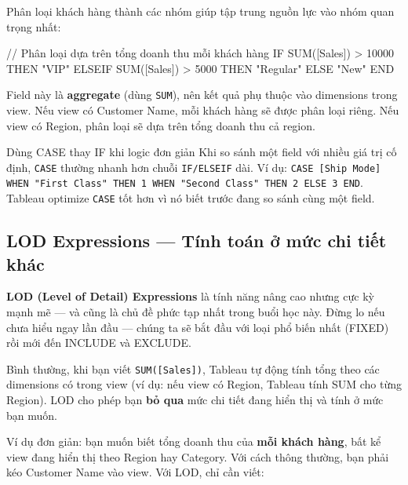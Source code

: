 \documentclass[12pt]{article}
\begin{document}
\noindent Phân loại khách hàng thành các nhóm giúp tập trung nguồn lực vào nhóm quan trọng nhất:

\begin{aivncodebox}[]
\begin{python}
// Phân loại dựa trên tổng doanh thu mỗi khách hàng
IF SUM([Sales]) > 10000 THEN "VIP"
ELSEIF SUM([Sales]) > 5000 THEN "Regular"
ELSE "New"
END
\end{python}
\end{aivncodebox}

\noindent Field này là \textbf{aggregate} (dùng \texttt{SUM}), nên kết quả phụ thuộc vào dimensions trong view. Nếu view có Customer Name, mỗi khách hàng sẽ được phân loại riêng. Nếu view có Region, phân loại sẽ dựa trên tổng doanh thu cả region.

\begin{guidelinebox}{Dùng CASE thay IF khi logic đơn giản}
Khi so sánh một field với nhiều giá trị cố định, \texttt{CASE} thường nhanh hơn chuỗi \texttt{IF/ELSEIF} dài. Ví dụ: \texttt{CASE [Ship Mode] WHEN "First Class" THEN 1 WHEN "Second Class" THEN 2 ELSE 3 END}. Tableau optimize \texttt{CASE} tốt hơn vì nó biết trước đang so sánh cùng một field.
\end{guidelinebox}


\subsection{LOD Expressions --- Tính toán ở mức chi tiết khác}

\noindent \textbf{LOD (Level of Detail) Expressions} là tính năng nâng cao nhưng cực kỳ mạnh mẽ --- và cũng là chủ đề phức tạp nhất trong buổi học này. Đừng lo nếu chưa hiểu ngay lần đầu --- chúng ta sẽ bắt đầu với loại phổ biến nhất (FIXED) rồi mới đến INCLUDE và EXCLUDE.

\noindent Bình thường, khi bạn viết \texttt{SUM([Sales])}, Tableau tự động tính tổng theo các dimensions có trong view (ví dụ: nếu view có Region, Tableau tính SUM cho từng Region). LOD cho phép bạn \textbf{bỏ qua} mức chi tiết đang hiển thị và tính ở mức bạn muốn.

\noindent Ví dụ đơn giản: bạn muốn biết tổng doanh thu của \textbf{mỗi khách hàng}, bất kể view đang hiển thị theo Region hay Category. Với cách thông thường, bạn phải kéo Customer Name vào view. Với LOD, chỉ cần viết:
\end{document}
